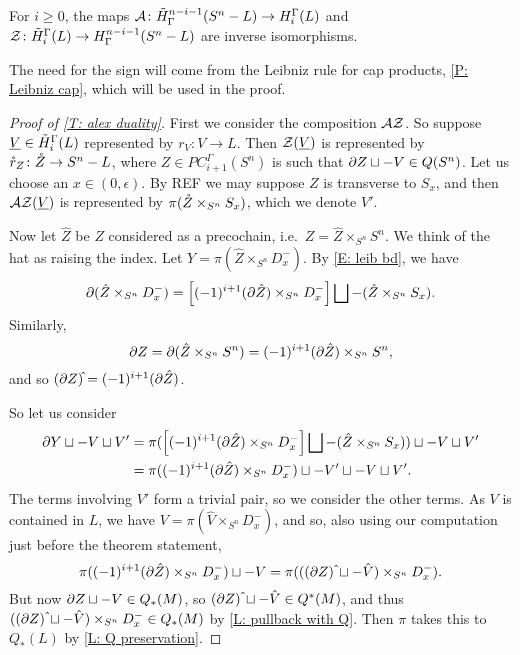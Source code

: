 \begin{example}
\begin{theorem}\label{T: alex duality}
For $i \geq 0$, the maps  $\mathcal{A} \colon \tilde H^{n-i-1}_\Gamma(S^n-L) \to H_i^\Gamma(L)$ and $\mathcal{Z} \colon \tilde H_i^\Gamma(L) \to H^{n-i-1}_\Gamma(S^n-L)$ are inverse isomorphisms.
\end{theorem}
The need for the sign will come from the Leibniz rule for cap products, \cref{P: Leibniz cap}, which will be used in the proof.


\begin{proof}[Proof of \cref{T: alex duality}]
First we consider the composition $\mathcal{A} \mathcal{Z}$.
So suppose $\underline{V} \in \tilde H_i^\Gamma(L)$ represented by $r_V \colon V \to L$.
Then $\mathcal{Z}(\underline{V})$ is represented by $\mathring{r}_Z \colon \mathring{Z} \to S^n-L$, where $Z \in PC_{i+1}^\Gamma(S^n)$ is such that $\partial Z \sqcup -V \in Q(S^n)$.
Let us choose an $x \in (0,\epsilon)$.
By REF we may suppose $Z$ is transverse to $S_x$, and then $\mathcal{A} \mathcal{Z}(\underline{V})$ is represented by $\pi(\mathring{Z} \times_{S^n} S_x)$, which we denote $V'$.

Now let $\hat Z$ be $Z$ considered as a precochain, i.e.\ $Z = \hat Z \times_{S^n} S^n$.
We think of the hat as raising the index.
Let $Y = \pi(\hat Z \times_{S^n} D_x^-)$.
By \eqref{E: leib bd}, we have
$$\partial (\hat Z \times_{S^n} D_x^-) = \left[(-1)^{i+1} (\partial \hat Z) \times_{S^n} D_x^-\right] \bigsqcup - (\hat Z \times_{S^n} S_x).$$
Similarly, $$\partial Z = \partial(\hat Z \times_{S^n} S^n) = (-1)^{i+1} (\partial \hat Z) \times_{S^n} S^n,$$
and so $(\bd Z)\hat{\vrule height1.3ex width0pt} = (-1)^{i+1} (\bd \hat Z)$.


So let us consider
\begin{align*}
\partial Y \sqcup -V\sqcup V'&=
\pi(\left[(-1)^{i+1} (\partial \hat Z) \times_{S^n} D_x^-\right] \bigsqcup - (\hat Z \times_{S^n} S_x))\sqcup -V \sqcup V'\\
&=\pi((-1)^{i+1} (\partial \hat Z) \times_{S^n} D_x^-) \sqcup -V' \sqcup -V \sqcup V'.
\end{align*}
The terms involving $V'$ form a trivial pair, so we consider the other terms.
As $V$ is contained in $L$, we have $V = \pi(\hat V \times_{S^n} D_x^-)$, and so, also using our computation just before the theorem statement,
$$\pi((-1)^{i+1} (\bd \hat Z) \times_{S^n} D_x^-) \sqcup -V = \pi(((\bd  Z)\,\hat{\vrule height1.3ex width0pt} \sqcup -\hat V) \times_{S^n} D_x^-).$$
But now $\partial Z \sqcup -V \in Q_*(M)$, so $(\bd  Z)\,\hat{\vrule height1.3ex width0pt} \sqcup -\hat V \in Q^*(M)$, and thus $((\bd  Z)\,\hat{\vrule height1.3ex width0pt} \sqcup -\hat V) \times_{S^n} D_x^- \in Q_*(M)$ by \cref{L: pullback with Q}.
Then $\pi$ takes this to $Q_*(L)$ by \cref{L: Q preservation}.


\end{proof}
\end{example}

